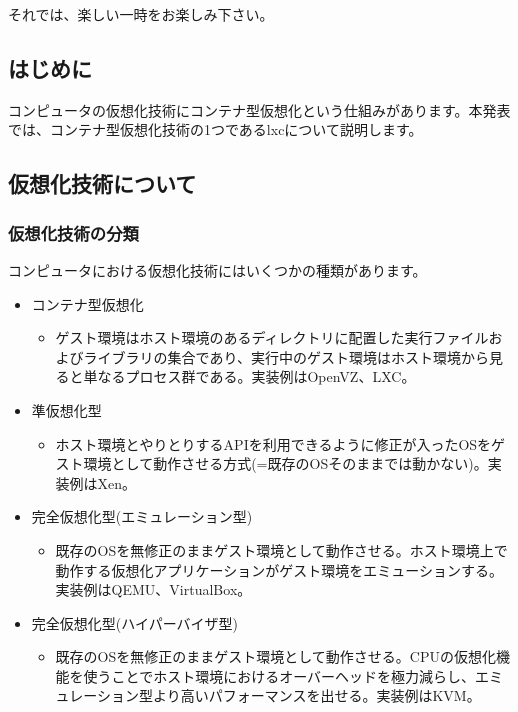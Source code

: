 \documentclass[mingoth,a4paper]{jsarticle}
\begin{document}
 それでは、楽しい一時をお楽しみ下さい。


\subsection{はじめに}

コンピュータの仮想化技術にコンテナ型仮想化という仕組みがあります。本発表では、コンテナ型仮想化技術の1つであるlxcについて説明します。

\subsection{仮想化技術について}

\subsubsection{仮想化技術の分類}

コンピュータにおける仮想化技術にはいくつかの種類があります。

\begin{itemize}
  \item コンテナ型仮想化
  \begin{itemize}
  \item ゲスト環境はホスト環境のあるディレクトリに配置した実行ファイルおよびライブラリの集合であり、実行中のゲスト環境はホスト環境から見ると単なるプロセス群である。実装例はOpenVZ、LXC。
  \end{itemize}
  \item 準仮想化型
  \begin{itemize}
  \item ホスト環境とやりとりするAPIを利用できるように修正が入ったOSをゲスト環境として動作させる方式(=既存のOSそのままでは動かない)。実装例はXen。
  \end{itemize}
  \item 完全仮想化型(エミュレーション型)
  \begin{itemize}
  \item 既存のOSを無修正のままゲスト環境として動作させる。ホスト環境上で動作する仮想化アプリケーションがゲスト環境をエミューションする。実装例はQEMU、VirtualBox。
  \end{itemize}
\item 完全仮想化型(ハイパーバイザ型)
  \begin{itemize}
  \item 既存のOSを無修正のままゲスト環境として動作させる。CPUの仮想化機能を使うことでホスト環境におけるオーバーヘッドを極力減らし、エミュレーション型より高いパフォーマンスを出せる。実装例はKVM。
  \end{itemize}
\end{itemize}
\end{document}
